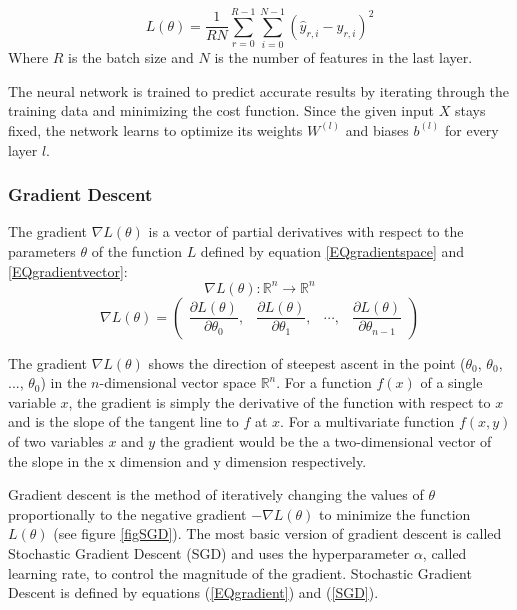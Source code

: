 \documentclass[a4paper,11pt,twoside]{article}
\newcommand*{\pd}[2]{\ensuremath{\dfrac{\partial #1}{\partial #2}}}
\begin{document}
\begin{equation}\label{MSE}
L(\theta) = \frac{1}{RN} \sum^{R-1}_{r=0} \sum^{N-1}_{i=0} (\hat{y}_{r,i}-y_{r,i})^2
\end{equation}
Where $R$ is the batch size and $N$ is the number of features in the last layer.

The neural network is trained to predict accurate results by iterating through the training data and minimizing the cost function. Since the given input $X$ stays fixed, the network learns to optimize its weights $W^{(l)}$ and biases $b^{(l)}$ for every layer $l$.

\subsubsection{Gradient Descent}
The gradient $\nabla L(\theta)$ is a vector of partial derivatives with respect to the parameters $\theta$ of the function $L$ defined by equation \eqref{EQgradientspace} and \eqref{EQgradientvector}: \cite{gradient} \cite{convmath} 
\begin{equation}\label{EQgradientspace}
\nabla L(\theta) : \mathbb{R}^n \to \mathbb{R}^n
\end{equation}
\begin{equation}\label{EQgradientvector}
\nabla L(\theta) = 
	\begin{pmatrix} 
		\pd{L(\theta)}{\theta_{0}}, & 
		\pd{L(\theta)}{\theta_{1}}, &
		\cdots, &
		\pd{L(\theta)}{\theta_{n-1}}
		
		\end{pmatrix}
\end{equation}

The gradient $\nabla L(\theta)$ shows the direction of steepest ascent in the point ($\theta_{0}$, $\theta_{0}$, ..., $\theta_{0}$) in the $n$-dimensional vector space $\mathbb{R}^{n}$. For a function $f(x)$ of a single variable $x$, the gradient is simply the derivative of the function with respect to $x$ and is the slope of the tangent line to $f$ at $x$. For a multivariate function $f(x,y)$ of two variables $x$ and $y$ the gradient would be the a two-dimensional vector of the slope in the x dimension and y dimension respectively. 

Gradient descent is the method of iteratively changing the values of $\theta$ proportionally to the negative gradient $-\nabla L(\theta)$ to minimize the function $L(\theta)$ (see figure \ref{figSGD}). The most basic version of gradient descent is called Stochastic Gradient Descent (SGD) and uses the hyperparameter $\alpha$, called learning rate, to control the magnitude of the gradient. Stochastic Gradient Descent is defined by equations (\ref{EQgradient}) and (\ref{SGD}).
\end{document}

